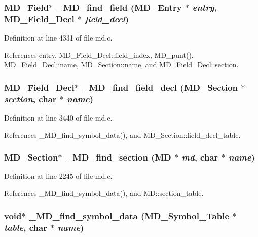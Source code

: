 \subsubsection{\setlength{\rightskip}{0pt plus 5cm}\bf{MD\_\-Field}$\ast$ \_\-MD\_\-find\_\-field (\bf{MD\_\-Entry} $\ast$ {\em entry}, \bf{MD\_\-Field\_\-Decl} $\ast$ {\em field\_\-decl})}\label{md_8c_60bb9dccadf40350e60bd27f6ecf7992}




Definition at line 4331 of file md.c.

References entry, MD\_\-Field\_\-Decl::field\_\-index, MD\_\-punt(), MD\_\-Field\_\-Decl::name, MD\_\-Section::name, and MD\_\-Field\_\-Decl::section.
\subsubsection{\setlength{\rightskip}{0pt plus 5cm}\bf{MD\_\-Field\_\-Decl}$\ast$ \_\-MD\_\-find\_\-field\_\-decl (\bf{MD\_\-Section} $\ast$ {\em section}, char $\ast$ {\em name})}\label{md_8c_121697787a08e7fbea3f858c99f44bb5}




Definition at line 3440 of file md.c.

References \_\-MD\_\-find\_\-symbol\_\-data(), and MD\_\-Section::field\_\-decl\_\-table.
\subsubsection{\setlength{\rightskip}{0pt plus 5cm}\bf{MD\_\-Section}$\ast$ \_\-MD\_\-find\_\-section (\bf{MD} $\ast$ {\em md}, char $\ast$ {\em name})}\label{md_8c_25ff9b27e19281657cfe776a8fea4fcf}




Definition at line 2245 of file md.c.

References \_\-MD\_\-find\_\-symbol\_\-data(), and MD::section\_\-table.
\subsubsection{\setlength{\rightskip}{0pt plus 5cm}void$\ast$ \_\-MD\_\-find\_\-symbol\_\-data (\bf{MD\_\-Symbol\_\-Table} $\ast$ {\em table}, char $\ast$ {\em name})}\label{md_8c_ed3cb8a2f399ad9ce8d7da6df35f8e81}




